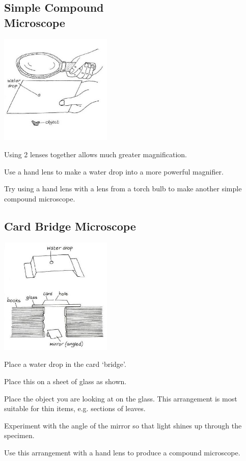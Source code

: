 \begin{multicols}{2}
\vfill
\columnbreak

\subsection[Simple Compound Microscope]{Simple Compound \hfill \\ Microscope}
\begin{center}
\includegraphics[width=0.4\textwidth]{./img/vso/compound-microscope.jpg}
\end{center}

\begin{itemize*}
\item Using 2 lenses together allows much greater magnification. 
\item Use a hand lens to make a water drop into a more powerful magnifier. 
\item Try using a hand lens with a lens from a torch bulb to make another simple compound microscope.
\end{itemize*}


\subsection{Card Bridge Microscope}
\begin{center}
\includegraphics[width=0.4\textwidth]{./img/vso/card-microscope.jpg}
\end{center}

\begin{itemize*}
\item Place a water drop in the card `bridge'. 
\item Place this on a sheet of glass as shown. 
\item Place the object you are looking
at on the glass. This
arrangement is most suitable
for thin items, e.g. sections of leaves. 
\item Experiment with the angle of
the mirror so that light shines
up through the specimen.
\item Use this arrangement with a
hand lens to produce a
compound microscope.
\end{itemize*}

\vfill

\end{multicols}